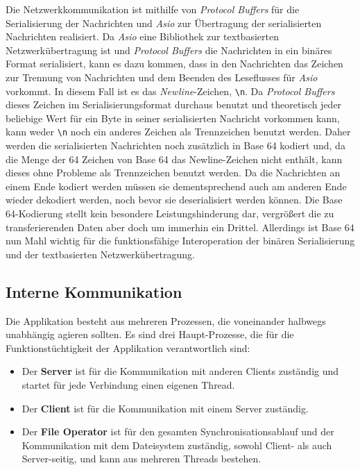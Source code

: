 Die Netzwerkkommunikation ist mithilfe von \textit{Protocol Buffers}\cite{proto} für die Serialisierung der Nachrichten und \textit{Asio}\cite{asio} 
zur Übertragung der serialisierten Nachrichten realisiert. Da \textit{Asio} eine Bibliothek zur textbasierten Netzwerkübertragung ist und 
\textit{Protocol Buffers} die Nachrichten in ein binäres Format serialisiert, kann es dazu kommen, dass in den Nachrichten das Zeichen zur Trennung 
von Nachrichten und dem Beenden des Leseflusses für \textit{Asio} vorkommt. In diesem Fall ist es das \textit{Newline}-Zeichen, \verb|\n|. 
Da \textit{Protocol Buffers} dieses Zeichen im Serialisierungsformat durchaus benutzt und theoretisch jeder beliebige Wert für ein Byte in 
seiner serialisierten Nachricht vorkommen kann, kann weder \verb|\n| noch ein anderes Zeichen als Trennzeichen benutzt werden.
Daher werden die serialisierten Nachrichten noch zusätzlich in Base 64 kodiert und, da die Menge der 64 Zeichen von Base 64 das Newline-Zeichen 
nicht enthält, kann dieses ohne Probleme als Trennzeichen benutzt werden. Da die Nachrichten an einem Ende kodiert werden müssen sie dementsprechend 
auch am anderen Ende wieder dekodiert werden, noch bevor sie deserialisiert werden können. Die Base 64-Kodierung stellt kein besondere Leistungshinderung
dar, vergrößert die zu transferierenden Daten aber doch um immerhin ein Drittel. Allerdings ist Base 64 nun Mahl wichtig für die funktionsfähige
Interoperation der binären Serialisierung und der textbasierten Netzwerkübertragung.

\subsection{Interne Kommunikation}
\label{sec:internekom}

Die Applikation besteht aus mehreren Prozessen, die voneinander halbwegs unabhängig agieren sollten. Es sind drei Haupt-Prozesse, 
die für die Funktionstüchtigkeit der Applikation verantwortlich sind:
\begin{itemize}
\item Der \textbf{Server} ist für die Kommunikation mit anderen Clients zuständig und startet für jede Verbindung einen eigenen Thread.
\item Der \textbf{Client} ist für die Kommunikation mit einem Server zuständig.
\item Der \textbf{File Operator} ist für den gesamten Synchronisationsablauf und der Kommunikation mit dem Dateisystem zuständig, 
      sowohl Client- als auch Server-seitig, und kann aus mehreren Threads bestehen. 
\end{itemize}

